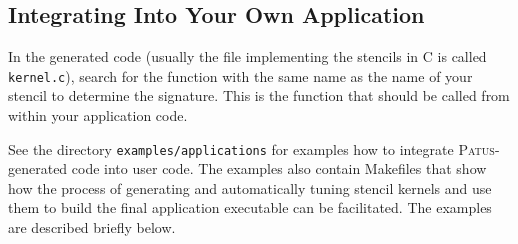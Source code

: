 \subsection{Integrating Into Your Own Application}


In the generated code (usually the file implementing the stencils in C is called \texttt{kernel.c}),
search for the function with the same name as the name of your stencil to determine the signature.
This is the function that should be called from within your application code.

See the directory \texttt{examples/applications} for examples how to integrate \textsc{Patus}-generated code
into user code.
The examples also contain Makefiles that show how the process of generating and automatically tuning stencil kernels
and use them to build the final application executable can be facilitated.
The examples are described briefly below.


